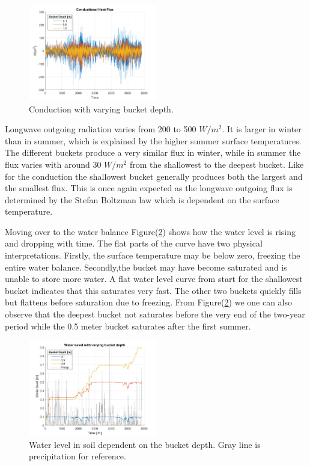 \documentclass[a4paper,11pt,twocolumn]{article}
\begin{document}
\begin{figure}[h]
	\centering 
	\includegraphics[width=0.5\textwidth]{figures/conduction}
	\caption{Conduction with varying bucket depth.}
	\label{fig:conduction}
\end{figure} 

Longwave outgoing radiation varies from 200 to 500 $W/m^2$. It is larger in winter than in summer, which is explained by the higher summer surface temperatures. The different buckets produce a very similar flux in winter, while in summer the flux varies with around 30 $W/m^2$ from the shallowest to the deepest bucket. Like for the conduction the shallowest bucket generally produces both the largest and the smallest flux. This is once again expected as the longwave outgoing flux is determined by the Stefan Boltzman law which is dependent on the surface temperature. 

Moving over to the water balance Figure(\ref{fig:bucket_fixed}) shows how the water level is rising and dropping with time. The flat parts of the curve have two physical interpretations. Firstly, the surface temperature may be below zero, freezing the entire water balance. Secondly,the bucket may have become saturated and is unable to store more water. A flat water level curve from start for the shallowest bucket indicates that this saturates very fast. The other two buckets quickly fills but flattens before saturation due to freezing. From Figure(\ref{fig:bucket_fixed}) we one can also observe that the deepest bucket not saturates before the very end of the two-year period while the 0.5 meter bucket saturates after the first summer. 

\begin{figure}[h]
	\centering 
	\includegraphics[width=0.5\textwidth]{figures/bucket_depth_fixed}
	\caption{Water level in soil dependent on the bucket depth.   Gray line is precipitation for reference.}
	\label{fig:bucket_fixed}
\end{figure}
\end{document}
